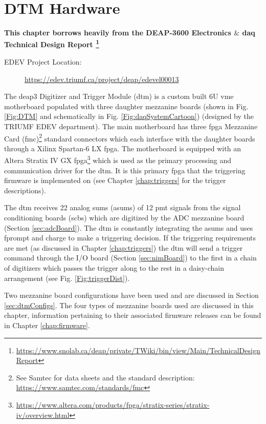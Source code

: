 \chapter{DTM Hardware}

\textbf{This chapter borrows heavily from the DEAP-3600 Electronics $\&$ \gls{daq} Technical Design Report \cite{technicalReport}\footnote{\url{https://www.snolab.ca/deap/private/TWiki/bin/view/Main/TechnicalDesignReport}}}
\begin{description}
\item[EDEV Project Location: ]\url{https://edev.triumf.ca/project/deap/edevel00013}
\end{description}
The \gls{deap3} Digitizer and Trigger Module (\gls{dtm}) is a custom built 6U \gls{vme} motherboard populated with three daughter mezzanine boards (shown in Fig. \ref{Fig:DTM} and schematically in Fig. \ref{Fig:daqSystemCartoon}) (designed by the TRIUMF EDEV department). 
The main motherboard has three \gls{fpga} Mezzanine Card (\gls{fmc})\footnote{See Samtec for data sheets and the standard description: \url{https://www.samtec.com/standards/fmc}} standard connectors which each interface with the daughter boards through a Xilinx Spartan-6 LX \gls{fpga}.
The motherboard is equipped with an Altera Stratix IV GX \gls{fpga}\footnote{\url{https://www.altera.com/products/fpga/stratix-series/stratix-iv/overview.html}} which is used as the primary processing and communication driver for the \gls{dtm}. It is this primary \gls{fpga} that the triggering firmware is implemented on (see Chapter \ref{chap:triggers} for the trigger descriptions).

The \gls{dtm} receives 22 analog sums (\gls{asum}s) of 12 \gls{pmt} signals from the signal conditioning boards (\gls{scb}s) which are digitized by the ADC mezzanine board (Section \ref{sec:adcBoard}). The \gls{dtm} is constantly integrating the \gls{asum}s and uses \gls{fprompt} and charge to make a triggering decision. If the triggering requirements are met (as discussed in Chapter \ref{chap:triggers}) the \gls{dtm} will send a trigger command through the I/O board (Section \ref{sec:nimBoard}) to the first in a chain of digitizers which passes the trigger along to the rest in a daisy-chain arrangement (see Fig. \ref{Fig:triggerDist}).

Two mezzanine board configurations have been used and are discussed in Section \ref{sec:dtmConfigs}. The four types of mezzanine boards used are discussed in this chapter, information pertaining to their associated firmware releases can be found in Chapter \ref{chap:firmware}. 

